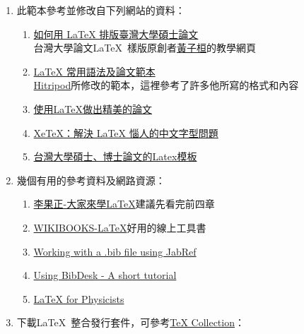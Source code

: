  \begin{enumerate}[leftmargin=0pt, topsep=0pt, itemsep=0pt, label=\Roman{*}.]
\item 此範本參考並修改自下列網站的資料：
\begin{enumerate}[topsep=0pt, itemsep=0pt, label=$\bullet$]
    \item \href{http://www.csie.ntu.edu.tw/~tzhuan/www/resources/ntu/}{如何用 LaTeX 排版臺灣大學碩士論文}\\
    \textemdash 台灣大學論文\LaTeX\ 樣版原創者\href{http://www.csie.ntu.edu.tw/~tzhuan/www/}{黃子桓}的教學網頁
    \item \href{http://www.hitripod.com/blog/2012/05/latex-thesis-template-quick-reference/}{LaTeX 常用語法及論文範本}\\
    \textemdash \href{http://www.hitripod.com/blog/}{Hitripod}所修改的範本，這裡參考了許多他所寫的格式和內容
    \item \href{http://www.cc.ntu.edu.tw/chinese/epaper/0014/20100920_1404.htm}{使用LaTeX做出精美的論文}
    \item \href{http://www.hitripod.com/blog/2011/04/xetex-chinese-font-cjk-latex/}{XeTeX：解決 LaTeX 惱人的中文字型問題}
    \item \href{http://code.google.com/p/ntuthesis/}{台灣大學碩士、博士論文的Latex模板}\\
\end{enumerate}
\item 幾個有用的參考資料及網路資源：
\begin{enumerate}[topsep=0pt, itemsep=0pt, label=$\bullet$]
    \item \href{run:./latex123.pdf}{李果正-大家來學\LaTeX}\textemdash 建議先看完前四章
    \item \href{http://en.wikibooks.org/wiki/LaTeX}{WIKIBOOKS-\LaTeX}\textemdash 好用的線上工具書
    \item \href{run:./Working_with_a_bib_file_using_Jabref.pdf}{Working with a .bib file using JabRef}
    \item \href{run:./Fi087_S.pdf}{Using BibDesk - A short tutorial}
    \item \href{http://www.dfcd.net/articles/latex/latex.html}{LaTeX for Physicists}\\
\end{enumerate}
\item 下載\LaTeX\ 整合發行套件，可參考\href{http://www.tug.org/texcollection/}{TeX Collection}：\label{it:download}
 \begin{enumerate}[topsep=0pt, itemsep=0pt, label=\arabic{*}.]

\end{enumerate}
\end{enumerate}
